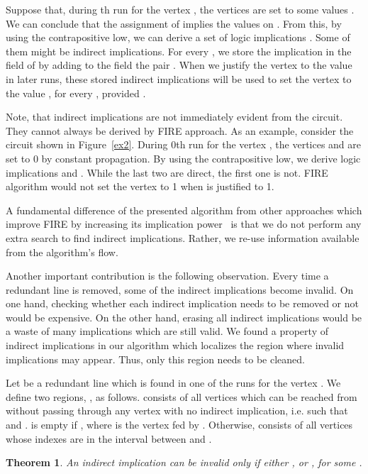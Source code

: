 \documentclass[conference]{IEEEtran} \usepackage{times}
\newtheorem{theorem}{Theorem}
\begin{document}
Suppose that, during th run for the vertex ,
the vertices  are set to some values .  We can conclude that
the assignment of  implies the values 
on . From this, by using the contrapositive low, we can
derive a set of logic implications .  Some of them might be indirect implications.  For
every , we store the implication  in the field
 of  by adding to the field the pair
.  When we justify the vertex  to the
value  in later runs, these stored indirect implications
will be used to set the vertex  to the value , for every , provided .

Note, that indirect implications are not immediately evident from the
circuit. They cannot always be derived by FIRE approach. As an
example, consider the circuit shown in Figure~\ref{ex2}. During 0th run
for the vertex , the vertices  and  are set to 0 by constant
propagation. By using the contrapositive low, we derive logic
implications 
and .  While the last two are direct, the
first one is not. FIRE algorithm would not set the vertex  to 1 when
 is justified to 1.


A fundamental difference of the presented algorithm from other approaches which
improve FIRE by increasing its implication
power~\cite{GuH00,Hs02,ViSH05} is that we do not perform any extra
search to find indirect implications.  Rather, we re-use information
available from the algorithm's flow.

Another important contribution is the following observation. Every
time a redundant line is removed, some of the indirect implications
become invalid.  On one hand, checking whether each indirect
implication needs to be removed or not would be expensive.  On the
other hand, erasing all indirect implications would be a waste of many
implications which are still valid.  We found a property of indirect
implications in our algorithm which localizes the region where invalid
implications may appear. Thus, only this region needs to be cleaned.

Let  be a redundant line which is found in one of the runs for the
vertex . We define two regions, , as follows.
 consists of all vertices which can be reached from
 without passing through any vertex  with no indirect
implication, i.e. such that  and
.
 is empty if , where  is the
vertex fed by .  Otherwise,  consists of all vertices whose
indexes are in the interval between  and .

\begin{theorem}
An indirect implication  can be invalid only if
either , or , for some .  
\end{theorem}
\end{document}
